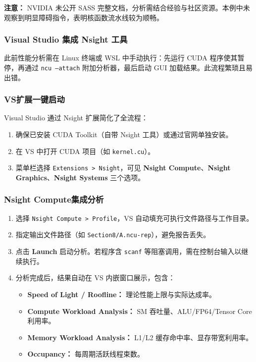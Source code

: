\textbf{注意：} NVIDIA 未公开 SASS 完整文档，分析需结合经验与社区资源。本例中未观察到明显障碍指令，表明核函数流水线较为顺畅。

\subsubsection{Visual Studio 集成 Nsight 工具}
此前性能分析需在 Linux 终端或 WSL 中手动执行：先运行 CUDA 程序使其暂停，再通过 \texttt{ncu --attach} 附加分析器，最后启动 GUI 加载结果。此流程繁琐且易出错。

\subsubsection{VS扩展一键启动}
Visual Studio 通过 Nsight 扩展简化了全流程：
\begin{enumerate}
    \item 确保已安装 CUDA Toolkit（自带 Nsight 工具）或通过官网单独安装。
    \item 在 VS 中打开 CUDA 项目（如 \texttt{kernel.cu}）。
    \item 菜单栏选择 \texttt{Extensions > Nsight}，可见 \textbf{Nsight Compute}、\textbf{Nsight Graphics}、\textbf{Nsight Systems} 三个选项。
\end{enumerate}

\subsubsection{Nsight Compute集成分析}
\begin{enumerate}
    \item 选择 \texttt{Nsight Compute > Profile}，VS 自动填充可执行文件路径与工作目录。
    \item 指定输出文件路径（如 \texttt{Section8/A.ncu-rep}），避免报告丢失。
    \item 点击 \textbf{Launch} 启动分析。若程序含 \texttt{scanf} 等阻塞调用，需在控制台输入以继续执行。
    \item 分析完成后，结果自动在 VS 内嵌窗口展示，包含：
    \begin{itemize}
        \item \textbf{Speed of Light / Roofline：} 理论性能上限与实际达成率。
        \item \textbf{Compute Workload Analysis：} SM 吞吐量、ALU/FP64/Tensor Core 利用率。
        \item \textbf{Memory Workload Analysis：} L1/L2 缓存命中率、显存带宽利用率。
        \item \textbf{Occupancy：} 每周期活跃线程束数。
    \end{itemize}
\end{enumerate}

